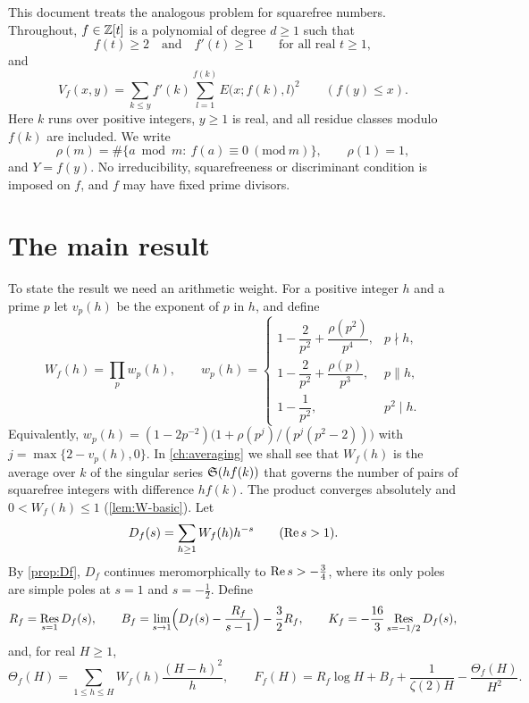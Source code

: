 This document treats the analogous problem for squarefree numbers. Throughout, $f\in\mathbb Z[t]$ is a polynomial of degree $d\ge1$ such that
\begin{equation}\label{eq:f-hyp}
f(t)\ge2\quad\text{and}\quad f'(t)\ge1\qquad\text{for all real }t\ge1,
\end{equation}
and
\begin{equation}\label{eq:Vf}
V_f(x,y)=\sum_{k\le y}f'(k)\sum_{l=1}^{f(k)}E\bigl(x;f(k),l\bigr)^2\qquad(f(y)\le x).
\end{equation}
Here $k$ runs over positive integers, $y\ge1$ is real, and all residue classes modulo $f(k)$ are included. We write
\[
\rho(m)=\#\{a\bmod m:\ f(a)\equiv0\ (\mathrm{mod}\ m)\},\qquad \rho(1)=1,
\]
and $Y=f(y)$. No irreducibility, squarefreeness or discriminant condition is imposed on $f$, and $f$ may have fixed prime divisors.

\section{The main result}

To state the result we need an arithmetic weight. For a positive integer $h$ and a prime $p$ let $v_p(h)$ be the exponent of $p$ in $h$, and define
\begin{equation}\label{eq:W-intro}
W_f(h)=\prod_p w_p(h),\qquad
w_p(h)=\begin{cases}
1-\dfrac2{p^2}+\dfrac{\rho(p^2)}{p^4},& p\nmid h,\\[2mm]
1-\dfrac2{p^2}+\dfrac{\rho(p)}{p^3},& p\parallel h,\\[2mm]
1-\dfrac1{p^2},& p^2\mid h.
\end{cases}
\end{equation}
Equivalently, $w_p(h)=(1-2p^{-2})\bigl(1+\rho(p^{j})/(p^{j}(p^2-2))\bigr)$ with $j=\max\{2-v_p(h),0\}$. In \cref{ch:averaging} we shall see that $W_f(h)$ is the average over $k$ of the singular series $\mathfrak S(hf(k))$ that governs the number of pairs of squarefree integers with difference $hf(k)$. The product converges absolutely and $0<W_f(h)\le1$ (\cref{lem:W-basic}). Let
\[
D_f(s)=\sum_{h\ge1}W_f(h)h^{-s}\qquad(\operatorname{Re} s>1).
\]
By \cref{prop:Df}, $D_f$ continues meromorphically to $\operatorname{Re} s>-\frac34$, where its only poles are simple poles at $s=1$ and $s=-\frac12$. Define
\begin{equation}\label{eq:RBK}
R_f=\operatorname*{Res}_{s=1}D_f(s),\qquad
B_f=\lim_{s\to1}\Bigl(D_f(s)-\frac{R_f}{s-1}\Bigr)-\frac32R_f,\qquad
K_f=-\frac{16}{3}\operatorname*{Res}_{s=-1/2}D_f(s),
\end{equation}
and, for real $H\ge1$,
\begin{equation}\label{eq:ThetaF}
\Theta_f(H)=\sum_{1\le h\le H}W_f(h)\frac{(H-h)^2}{h},\qquad
F_f(H)=R_f\log H+B_f+\frac{1}{\zeta(2)H}-\frac{\Theta_f(H)}{H^2}.
\end{equation}

